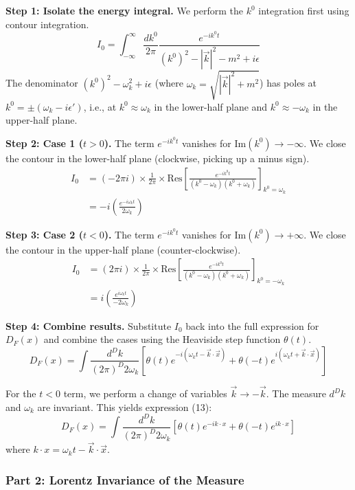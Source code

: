 \documentclass[11pt]{article}
\begin{document}
\begin{itemize}
\textbf{Step 1: Isolate the energy integral.} We perform the $k^0$ integration first using contour integration.
\[ I_0 = \int_{-\infty}^{\infty} \frac{dk^0}{2\pi} \frac{e^{-ik^0 t}}{(k^0)^2 - |\vec{k}|^2 - m^2 + i\epsilon} \]
The denominator $(k^0)^2 - \omega_k^2 + i\epsilon$ (where $\omega_k = \sqrt{|\vec{k}|^2 + m^2}$) has poles at $k^0 = \pm(\omega_k - i\epsilon')$, i.e., at $k^0 \approx \omega_k$ in the lower-half plane and $k^0 \approx -\omega_k$ in the upper-half plane.

\textbf{Step 2: Case 1 ($t>0$).} The term $e^{-ik^0 t}$ vanishes for $\text{Im}(k^0) \to -\infty$. We close the contour in the lower-half plane (clockwise, picking up a minus sign).
\begin{align*}
    I_0 &= (-2\pi i) \times \frac{1}{2\pi} \times \text{Res}\left[\frac{e^{-ik^0 t}}{(k^0-\omega_k)(k^0+\omega_k)}\right]_{k^0=\omega_k} \\
        &= -i \left( \frac{e^{-i\omega_k t}}{2\omega_k} \right)
\end{align*}

\textbf{Step 3: Case 2 ($t<0$).} The term $e^{-ik^0 t}$ vanishes for $\text{Im}(k^0) \to +\infty$. We close the contour in the upper-half plane (counter-clockwise).
\begin{align*}
    I_0 &= (2\pi i) \times \frac{1}{2\pi} \times \text{Res}\left[\frac{e^{-ik^0 t}}{(k^0-\omega_k)(k^0+\omega_k)}\right]_{k^0=-\omega_k} \\
        &= i \left( \frac{e^{i\omega_k t}}{-2\omega_k} \right)
\end{align*}

\textbf{Step 4: Combine results.} Substitute $I_0$ back into the full expression for $D_F(x)$ and combine the cases using the Heaviside step function $\theta(t)$.
\[ D_F(x) = \int \frac{d^Dk}{(2\pi)^D 2\omega_k} \left[ \theta(t)e^{-i(\omega_k t - \vec{k}\cdot\vec{x})} + \theta(-t)e^{i(\omega_k t + \vec{k}\cdot\vec{x})} \right] \]

For the $t<0$ term, we perform a change of variables $\vec{k} \to -\vec{k}$. The measure $d^Dk$ and $\omega_k$ are invariant. This yields expression (13):
\begin{equation}
    \boxed{D_F(x) = \int \frac{d^Dk}{(2\pi)^D 2\omega_k} \left[ \theta(t)e^{-ik\cdot x} + \theta(-t)e^{ik\cdot x} \right]}
\end{equation}
where $k \cdot x = \omega_k t - \vec{k}\cdot\vec{x}$.

\subsubsection{Part 2: Lorentz Invariance of the Measure}


\end{itemize}
\end{document}
